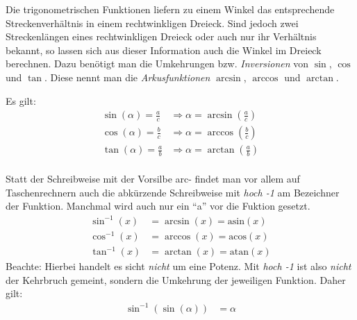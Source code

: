 \begin{defi}[Arkusfunktionen]
Die trigonometrischen Funktionen liefern zu einem Winkel das entsprechende Streckenverhältnis in einem rechtwinkligen Dreieck. Sind jedoch zwei Streckenlängen eines rechtwinkligen Dreieck oder auch nur ihr Verhältnis bekannt, so lassen sich aus dieser Information auch die Winkel im Dreieck berechnen. Dazu benötigt man die Umkehrungen bzw. \emph{Inversionen} von \(\sin\), \(\cos\) und \(\tan\). Diese nennt man die \emph{Arkusfunktionen} \(\arcsin\), \(\arccos\) und \(\arctan\).

Es gilt:
\begin{align*}
 \sin (\alpha) = \frac{a}{c} &\Rightarrow \alpha = \arcsin \left( \frac{a}{c}\right) \\
  \cos (\alpha) = \frac{b}{c} &\Rightarrow \alpha = \arccos \left( \frac{b}{c}\right) \\
  \tan (\alpha) = \frac{a}{b} &\Rightarrow \alpha = \arctan \left( \frac{a}{b}\right) \\
\end{align*}

Statt der Schreibweise mit der Vorsilbe arc- findet man vor allem auf Taschenrechnern auch die abkürzende Schreibweise mit \emph{hoch -1} am Bezeichner der Funktion. Manchmal wird auch nur ein "`a"' vor die Fuktion gesetzt.
\begin{align*}
 \sin^{-1} (x) &= \arcsin (x) = \textrm{asin} (x)\\
 \cos^{-1} (x) &= \arccos (x) = \textrm{acos} (x)\\
 \tan^{-1} (x) &= \arctan (x) = \textrm{atan} (x)
\end{align*}
Beachte: Hierbei handelt es sicht \emph{nicht} um eine Potenz. Mit \emph{hoch -1} ist also \emph{nicht} der Kehrbruch gemeint, sondern die Umkehrung der jeweiligen Funktion. Daher gilt:
\begin{align*}
 \sin^{-1}\left( \sin (\alpha) \right) &= \alpha
\end{align*}
\end{defi}

\begin{beme}
 
\end{beme}



\begin{beme}
 
\end{beme}




